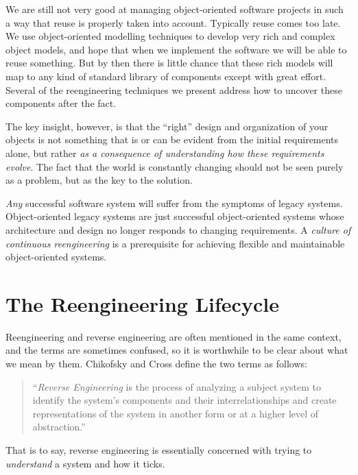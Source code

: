 \documentclass[a4paper,10pt,twoside]{book}
\begin{document}
We are still not very good at managing object-oriented software projects in such a way that reuse is properly taken into account. Typically reuse comes too late. We use object-oriented modelling techniques to develop very rich and complex object models, and hope that when we implement the software we will be able to reuse something. But by then there is little chance that these rich models will map to any kind of standard library of components except with great effort. Several of the reengineering techniques we present address how to uncover these components after the fact.

The key insight, however, is that the ``right'' design and organization of your objects is not something that is or can be evident from the initial requirements alone, but rather \emph{as a consequence of understanding how these requirements evolve}. The fact that the world is constantly changing should not be seen purely as a problem, but as the key to the solution. 

\emph{Any} successful software system will suffer from the symptoms of legacy systems. Object-oriented legacy systems are just successful object-oriented systems whose architecture and design no longer responds to changing requirements. A \emph{culture of continuous reengineering} is a prerequisite for achieving flexible and maintainable object-oriented systems.

\section{The Reengineering Lifecycle}

Reengineering and reverse engineering are often mentioned in the same context, and the terms are sometimes confused, so it is worthwhile to be clear about what we mean by them. Chikofsky and Cross \cite{Chik92a} define the two terms as follows:

\begin{quotation}
\noindent
``\emph{Reverse Engineering} is the process of analyzing a subject system to identify the system's components and their interrelationships and create representations of the system in another form or at a higher level of abstraction.'' 
\end{quotation}

That is to say, reverse engineering is essentially concerned with trying to \emph{understand} a system and how it ticks.
\end{document}

